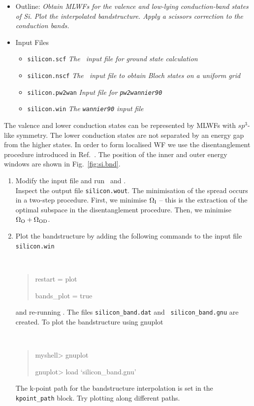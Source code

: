 \documentclass[a4paper,11pt,twoside]{article}
\begin{document}
\begin{itemize}
\item{Outline: \it{Obtain MLWFs for the valence and low-lying
      conduction-band states of Si. Plot the interpolated
      bandstructure. Apply a scissors correction to the conduction
      bands.}}
\item{Input Files}
\begin{itemize}
\item{ {\tt silicon.scf}  {\it The \pwscf\ input file for ground state
    calculation}} 
\item{ {\tt silicon.nscf}  {\it The \pwscf\ input file to obtain Bloch
    states on a uniform grid}} 
\item{ {\tt silicon.pw2wan}  {\it Input file for {\tt pw2wannier90}}}
\item{ {\tt silicon.win}  {\it The {\tt wannier90} input file}}
\end{itemize}
\end{itemize}
The valence and lower conduction states can be represented by MLWFs
with $sp^3$-like symmetry. The lower conduction states are not
separated by an energy gap from the higher states. In order to form
localised WF we use the disentanglement procedure introduced in
Ref.~\cite{souza-prb01}. The position of the inner and outer energy
windows are shown in Fig.~\ref{fig:si.bnd}.
\begin{enumerate}
\item Modify the input file and run \pwscf\ and \wannier.\\
Inspect the output file {\tt silicon.wout}. The minimisation of the
spread occurs in a two-step procedure. First, we minimise $\Omega_{\rm
  I}$ -- this is the extraction of the optimal subspace in the 
disentanglement procedure. Then, we minimise $\Omega_{\rm
  O}+\Omega_{{\rm OD}}$.

\item Plot the bandstructure by adding the following commands to the
 input file {\tt silicon.win}
{\tt
\begin{quote}
restart = plot

bands\_plot = true
\end{quote} }
and re-running \wannier. The files {\tt silicon\_band.dat} and {\tt
  silicon\_band.gnu} are created. To plot the bandstructure using
  gnuplot \smallskip
{\tt
\begin{quote}
myshell> gnuplot

gnuplot> load `silicon\_band.gnu'
\end{quote} }
The k-point path for the bandstructure interpolation is set in the {\tt
  kpoint\_path} block. Try plotting along different paths. 

%
%
%

\end{enumerate}
\end{document}
